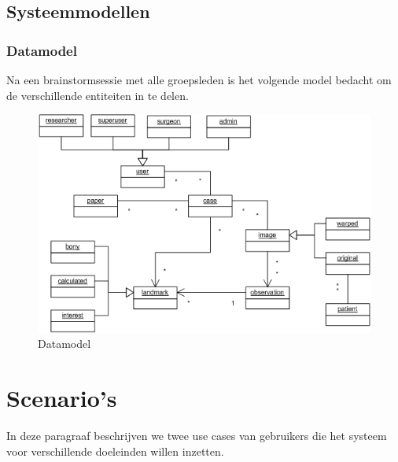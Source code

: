 \subsection{Systeemmodellen}
\subsubsection{Datamodel}
Na een brainstormsessie met alle groepsleden is het volgende model bedacht om de verschillende entiteiten in te delen.
\begin{figure}[htp]
\begin{center}
	\includegraphics[scale=0.65]{brainstorm_klassediagram}
\caption{Datamodel}
\label{default}
\end{center}
\end{figure}


\section{Scenario's}

In deze paragraaf beschrijven we twee use cases van gebruikers die het systeem voor verschillende doeleinden willen inzetten.

